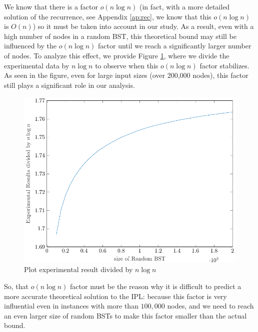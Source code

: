 

We know that there is a factor \( o(n \log n) \) (in fact, with a more detailed solution of the recurrence, see Appendix \ref{ap:rec}, we know that this $o(n \log n)$ is $O(n)$) so it must be taken into account in our study. As a result, even with a high number of nodes in a random BST, this theoretical bound may still be influenced by the \( o(n \log n) \) factor until we reach a significantly larger number of nodes. To analyze this effect, we provide Figure \ref{fig:plotBoundCtIPL}, where we divide the experimental data by \( n \log n \) to observe when this \( o(n \log n) \) factor stabilizes. As seen in the figure, even for large input sizes (over 200,000 nodes), this factor still plays a significant role in our analysis.

\begin{figure}[ht]
    \centering
    \includegraphics[scale=0.65]{plotCtIPL.pdf}
    \caption{Plot experimental result divided by $n \log n$}
    \label{fig:plotBoundCtIPL}
\end{figure}

So, that $o(n \log n)$ factor must be the reason why it is difficult to predict a more accurate theoretical solution to the IPL: because this factor is very influential even in instances with more than $100,000$ nodes, and we need to reach an even larger size of random BSTs to make this factor smaller than the actual bound.
